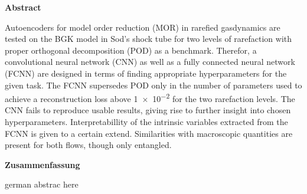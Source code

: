 

%
%
{
\pagestyle{empty}
\begin{center}
{\sffamily \bfseries\Large Abstract}\\
\end{center}%
\vspace{1cm}
%
Autoencoders for model order reduction (MOR) in rarefied gasdynamics are tested on the BGK model in Sod's shock tube for two levels of rarefaction with proper orthogonal decomposition (POD) as a benchmark. Therefor, a convolutional neural network (CNN) as well as a fully connected neural network (FCNN) are designed in terms of finding appropriate hyperparameters for the given task. The FCNN supersedes POD only in the number of parameters used to achieve a reconstruction loss above \num{1e-2} for the two rarefaction levels. The CNN fails to reproduce usable results, giving rise to further insight into chosen hyperparameters. Interpretabillity of the intrinsic variables extracted from the FCNN is given to a certain extend. Similarities with macroscopic quantities are present for both flows, though only entangled.         
\vspace{1.5cm}

%
\begin{center}
{\sffamily \bfseries\Large Zusammenfassung}\\
\end{center}%
\vspace{1cm}
%
german abstrac here

\newpage
\pagestyle{plain}
}